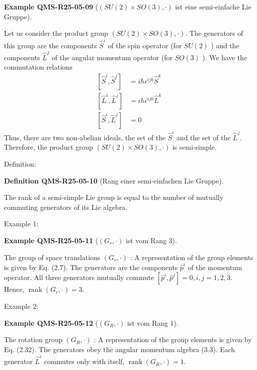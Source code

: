 \documentclass[10pt, letterpaper]{article}
\newcommand{\CustomHeading}[3]{%
  \par\medskip\noindent%
  \textbf{#1 #2} \textnormal{(#3)}.\enskip%
}
\newenvironment{DEF}[2]{\begin{unitbox}\CustomHeading{Definition}{#1}{#2}}{\end{unitbox}}
\newenvironment{EXA}[2]{\begin{unitbox}\CustomHeading{Example}{#1}{#2}}{\end{unitbox}}
\begin{document}
\begin{EXA}{QMS-R25-05-09}{$(S U(2) \times S O(3), \cdot)$ ist eine semi-einfache Lie Gruppe}
Let us consider the product group $(S U(2) \times S O(3), \cdot)$. The generators of this group are the components $\hat{S}^{i}$ of the spin operator (for $S U(2)$ ) and the components $\hat{L}^{j}$ of the angular momentum operator (for $S O(3)$ ). We have the commutation relations
$$
\begin{aligned}
{\left[\hat{S}^{i}, \hat{S}^{j}\right] } & =i \hbar \epsilon^{i j k} \hat{S}^{k} \\
{\left[\hat{L}^{i}, \hat{L}^{j}\right] } & =i \hbar \epsilon^{i j k} \hat{L}^{k} \\
{\left[\hat{S}^{i}, \hat{L}^{j}\right] } & =0
\end{aligned}
$$
Thus, there are two non-abelian ideals, the set of the $\hat{S}^{i}$ and the set of the $\hat{L}^{j}$. Therefore, the product group $(S U(2) \times S O(3), \cdot)$ is semi-simple.
\end{EXA}


Definition: 


\begin{DEF}{QMS-R25-05-10}{Rang einer semi-einfachen Lie Gruppe}
The rank of a semi-simple Lie group is equal to the number of mutually commuting generators of its Lie algebra.
\end{DEF}


Example 1: 


\begin{EXA}{QMS-R25-05-11}{$\left(G_{r}, \cdot\right)$ ist vom Rang 3}
The group of space translations $\left(G_{r}, \cdot\right)$ : A representation of the group elements is given by Eq. (2.7). The generators are the components $\hat{p}^{i}$ of the momentum operator. All three generators mutually commute $\left[\hat{p}^{i}, \hat{p}^{j}\right]=0, i, j=1,2,3$. Hence, $\operatorname{rank}\left(G_{r}, \cdot\right)=3$.
\end{EXA}


Example 2: 

\begin{EXA}{QMS-R25-05-12}{$\left(G_{R}, \cdot\right)$ ist vom Rang 1}
The rotation group $\left(G_{R}, \cdot\right)$ : A representation of the group elements is given by Eq. (2.32). The generators obey the angular momentum algebra (3.3). Each generator $\hat{L}^{i}$ commutes only with itself, $\operatorname{rank}\left(G_{R}, \cdot\right)=1$.
\end{EXA}
\end{document}
